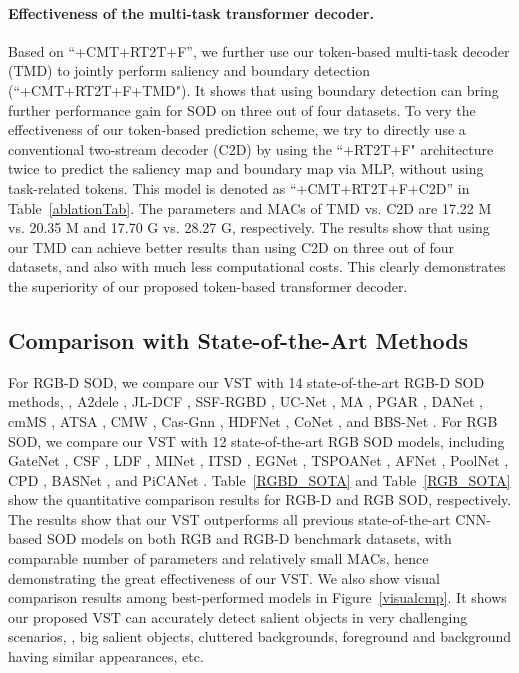 \documentclass[10pt,twocolumn,letterpaper]{article}
\begin{document}
\paragraph{Effectiveness of the multi-task transformer decoder.}
Based on ``+CMT+RT2T+F'', we further use our token-based multi-task decoder (TMD) to jointly perform saliency and boundary detection (``+CMT+RT2T+F+TMD"). It shows that using boundary detection can bring further performance gain for SOD on three out of four datasets. To very the effectiveness of our token-based prediction scheme, we try to directly use a conventional two-stream decoder (C2D) by using the ``+RT2T+F" architecture twice to predict the saliency map and boundary map via MLP, without using task-related tokens. This model is denoted as ``+CMT+RT2T+F+C2D'' in Table~\ref{ablationTab}.
The parameters and MACs of TMD vs. C2D are 17.22 M vs. 20.35 M and 17.70 G vs. 28.27 G, respectively.
The results show that using our TMD can achieve better results than using C2D on three out of four datasets, and also with much less computational costs. This clearly demonstrates the superiority of our proposed token-based transformer decoder.


\subsection{Comparison with State-of-the-Art Methods}
For RGB-D SOD, we compare our VST with 14 state-of-the-art RGB-D SOD methods, \ie, A2dele \cite{piao2020a2dele}, JL-DCF \cite{Fu2020JLDCF}, SSF-RGBD \cite{zhang2020select}, UC-Net \cite{zhang2020ucnet}, MA \cite{liu2020S2MA}, PGAR \cite{chen2020PGAR}, DANet \cite{zhao2020DANet}, cmMS \cite{li2020cmMS}, ATSA \cite{zhang2020ATSA}, CMW \cite{Li2020CMWNet}, Cas-Gnn \cite{luo2020Cas-Gnn}, HDFNet \cite{HDFNet-ECCV2020}, CoNet \cite{Wei2020CoNet}, and BBS-Net \cite{fan2020bbsnet}.
For RGB SOD, we compare our VST with 12 state-of-the-art RGB SOD models, including GateNet \cite{GateNet}, CSF \cite{gao2020sod100k}, LDF \cite{CVPR2020_LDF}, MINet \cite{MINet-CVPR2020}, ITSD \cite{Zhou2020ITSD}, EGNet \cite{zhao2019EGNet}, TSPOANet \cite{Liu_TSPOANet}, AFNet \cite{Feng_AFNet}, PoolNet \cite{Liu19PoolNet}, CPD \cite{Wu_CPD}, BASNet \cite{Qin19BASNet}, and PiCANet \cite{liu2018picanet}. 
Table~\ref{RGBD_SOTA} and Table~\ref{RGB_SOTA} show the quantitative comparison results for RGB-D and RGB SOD, respectively.
The results show that our VST outperforms all previous state-of-the-art CNN-based SOD models on both RGB and RGB-D benchmark datasets, with comparable number of parameters and relatively small MACs, hence demonstrating the great effectiveness of our VST.
We also show visual comparison results among best-performed models in Figure~\ref{visualcmp}. It shows our proposed VST can accurately detect salient objects in very challenging scenarios, \eg, big salient objects, cluttered backgrounds, foreground and background having similar appearances, etc.
\end{document}
